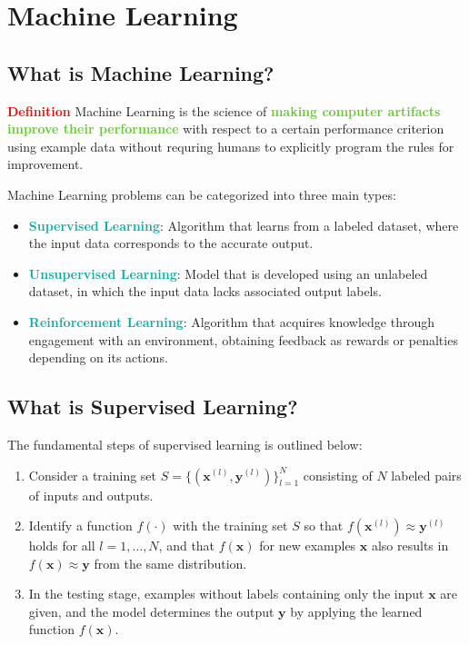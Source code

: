 \documentclass[twoside]{article}
\newcommand{\definition}[1]{\begin{definitionbox} \textcolor{red}{{\scriptsize\faStar} \textbf{Definition}} \newline #1 \end{definitionbox}}
\newcommand{\highlightbluetext}[1]{\textcolor[HTML]{09ACA6}{\textbf{#1}}}
\newcommand{\highlightgreentext}[1]{\textcolor[HTML]{62C92F}{\textbf{#1}}}
\numberwithin{equation}{section}
\begin{document}
	\fancyfoot{}

	\fancyfoot[RO, LE]{\thepage}
	
	\setcounter{page}{1}
	
	\tableofcontents
	
	\newpage
	
	\section{Machine Learning}
	\label{sec:MachineLearning}
	
	\subsection{What is Machine Learning?}
	\label{subsec:WhatIsMachineLearning}

	\definition{Machine Learning is the science of \highlightgreentext{making computer artifacts improve their performance} with respect to a certain performance criterion using example data without requring humans to explicitly program the rules for improvement.}
	
	Machine Learning problems can be categorized into three main types:
	\begin{itemize}
		\item \highlightbluetext{Supervised Learning}: Algorithm that learns from a labeled dataset, where the input data corresponds to the accurate output.
		\item \highlightbluetext{Unsupervised Learning}: Model that is developed using an unlabeled dataset, in which the input data lacks associated output labels.
		\item \highlightbluetext{Reinforcement Learning}: Algorithm that acquires knowledge through engagement with an environment, obtaining feedback as rewards or penalties depending on its actions.
	\end{itemize}

	\subsection{What is Supervised Learning?}
	\label{subsec:WhatIsSupervisedLearning}
	The fundamental steps of supervised learning is outlined below:
	\begin{enumerate}
		\item Consider a training set $S = \{(\mathbf{x}^{(l)}, \mathbf{y}^{(l)})\}_{l=1}^N$ consisting of $N$ labeled pairs of inputs and outputs. 
		\item Identify a function $f(\cdot)$ with the training set $S$ so that $f(\mathbf{x}^{(l)}) \approx \mathbf{y}^{(l)}$ holds for all $l = 1, \ldots, N$, and that $f(\mathbf{x})$ for new examples $\mathbf{x}$ also results in $f(\mathbf{x}) \approx \mathbf{y}$ from the same distribution. 
		\item In the testing stage, examples without labels containing only the input $\mathbf{x}$ are given, and the model determines the output $\mathbf{y}$ by applying the learned function $f(\mathbf{x})$.
	\end{enumerate}
\end{document}
